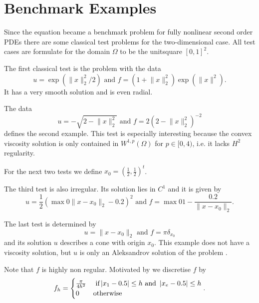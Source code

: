 \section{Benchmark Examples}

Since the \MA equation became a benchmark problem for fully nonlinear second order PDEs there are some classical test problems for the two-dimensional case. All test cases are formulate for the domain $\Omega$ to be the unitsquare $[0,1]^2$.

\begin{test} \label{test smooth}
The first classical \MA test is the problem with the data
\[
	u=\exp( \lVert x \rVert_2^2  /2) 
	\text { and } 
	f = (1 + \lVert x \rVert_2^2) \exp( \lVert x \rVert^2).
\]
It has a very smooth solution and is even radial.

\end{test}

\begin{test}\label{test sqrt}
The data
\[
	u = - \sqrt{ 2-  \lVert x \rVert_2^2}
	\text { and } 
	f = 2\left( 2-  \lVert x \rVert_2^2 \right)^{-2}
\]
defines the second example. This test is especially interesting because the convex viscosity solution is only contained in $W^{1,p}(\Omega) $ for $p \in [0,4)$\cite{DG2006a}, i.e. it lacks $H^2$ regularity.
\end{test}

For the next two tests we define $x_0 = \left(\frac 1 2, \frac 1 2  \right)^t$.

\begin{test}\label{test singularity}
The third \MA test is also irregular. Its solution lies in $C^1$ and it is given by
\[
	u=\frac 1 2 \left( \max 0 {\lVert x - x_0 \rVert_2-0.2 }  \right)^2 
	\text { and } 
	f = \max 0 {1-\frac {0.2} {\lVert x - x_0 \rVert_2} }.
\]
\end{test}


\begin{test}\label{test dirac}
The last test is determined by
\[
	u = \lVert x - x_0 \rVert_2
	\text { and } 
	f = \pi \delta_{x_0}
\]
and its solution $u$ describes a cone with origin $x_0$. This example does not have a viscosity solution, but $u$ is only an Aleksandrov solution of the problem \cite[Section 2.3.]{FO2011}.

Note that $f$ is highly non regular. Motivated by \cite[Section 6.1.]{FO2011} we discretise $f$ by
\begin{align*}
	f_h = \begin{cases}
		\frac \pi {4h^2} & \text{ if} \left| x_1 - 0.5 \right| \leq h \text{ and } \left| x_e - 0.5 \right| \leq h \\
		0	& \text{otherwise}
	\end{cases}.
\end{align*}
\end{test}


